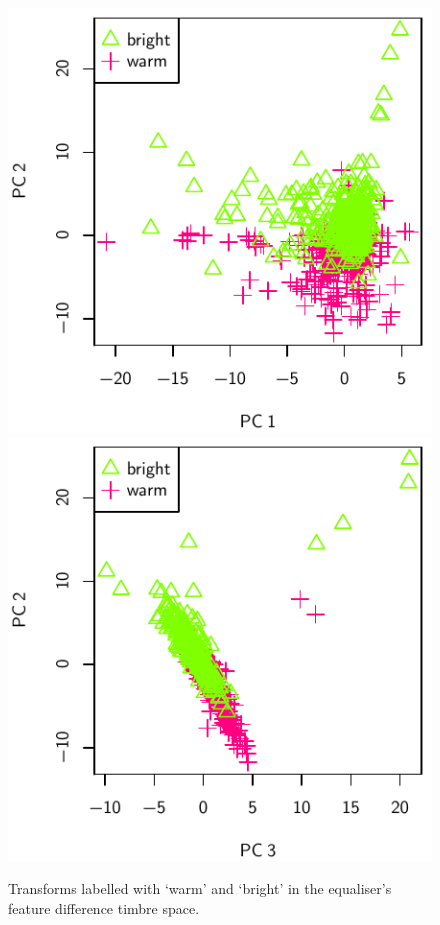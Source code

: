 			\begin{figure}[h!]
				\centering
				\subfloat
				{
					\includegraphics{chapter4/Images/EqualiserBWDifferencePCA1-2.pdf}
					\label{fig:EqualiserDifferencePCA1-2}
				}
				\quad
				\subfloat
				{
					\includegraphics{chapter4/Images/EqualiserBWDifferencePCA3-2.pdf}
					\label{fig:EqualiserDifferencePCA3-2}
				}
				\caption{Transforms labelled with `warm' and `bright' in the equaliser's
					 feature difference timbre space.}
				\label{fig:EqualiserBWDifferencePCAs}
			\end{figure}

